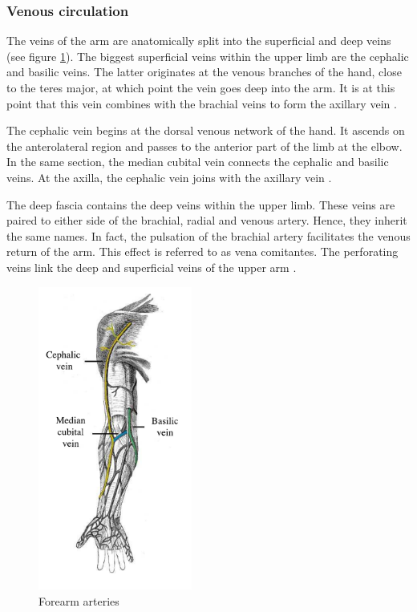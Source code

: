 \subsubsection{Venous circulation}
The veins of the arm are anatomically split into the superficial and deep veins (see figure \ref{fig:arm veind}). The biggest superficial veins within the upper limb are the cephalic and basilic veins. The latter originates at the venous branches of the hand, close to the teres major, at which point the vein goes deep into the arm. It is at this point that this vein combines with the brachial veins to form the axillary vein \cite{scanlon2014essentials}. 

The cephalic vein begins at the dorsal venous network of the hand. It ascends on the anterolateral region and passes to the anterior part of the limb at the elbow. In the same section, the median cubital vein connects the cephalic and basilic veins. At the axilla, the cephalic vein joins with the axillary vein \cite{scanlon2014essentials}. 

The deep fascia contains the deep veins within the upper limb. These veins are paired to either side of the brachial, radial and venous artery. Hence, they inherit the same names.  In fact, the pulsation of the brachial artery facilitates the venous return of the arm. This effect is referred to as vena comitantes. The perforating veins link the deep and superficial veins of the upper arm \cite{scanlon2014essentials}. 

\begin{figure}[!htpb]
	\centering
	\includegraphics[height=10cm,keepaspectratio]{figure21}
	\caption{Forearm arteries}
	\label{fig:arm veind}
\end{figure} 

